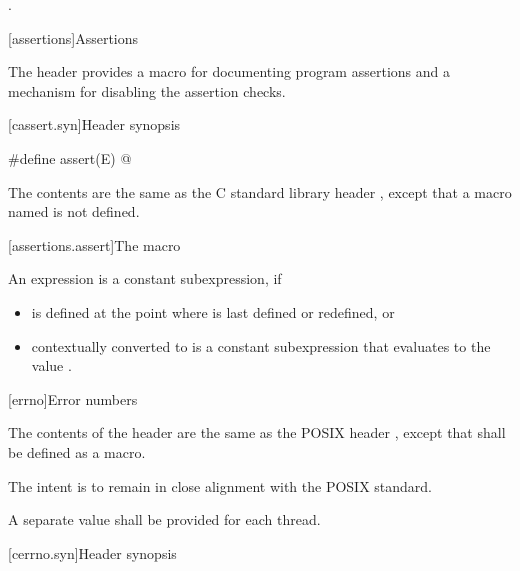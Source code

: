 \begin{itemdescr}

\pnum
\ensures
{}.
\end{itemdescr}

[assertions]{Assertions}

\pnum
The header
provides a macro for documenting \Cpp{} program assertions and a mechanism
for disabling the assertion checks.

[cassert.syn]{Header  synopsis}

%
%
\begin{codeblock}
#define assert(E) @\seebelow@
\end{codeblock}

\pnum
{}%
%
The contents are the same as the C standard library header
,
except that a macro named 
is not defined.


[assertions.assert]{The  macro}

\pnum
An expression 
is a constant subexpression, if
\begin{itemize}
\item
{} is defined at the point where 
is last defined or redefined, or
\item
{} contextually converted to 
is a constant subexpression that evaluates to the value .
\end{itemize}

[errno]{Error numbers}

\pnum
{}%
The contents of the header  are the same as the POSIX header
, except that  shall be defined as a macro.
\begin{note}
The intent is to remain in close alignment with the POSIX standard.
\end{note}
A separate  value shall be provided for each thread.

[cerrno.syn]{Header  synopsis}

